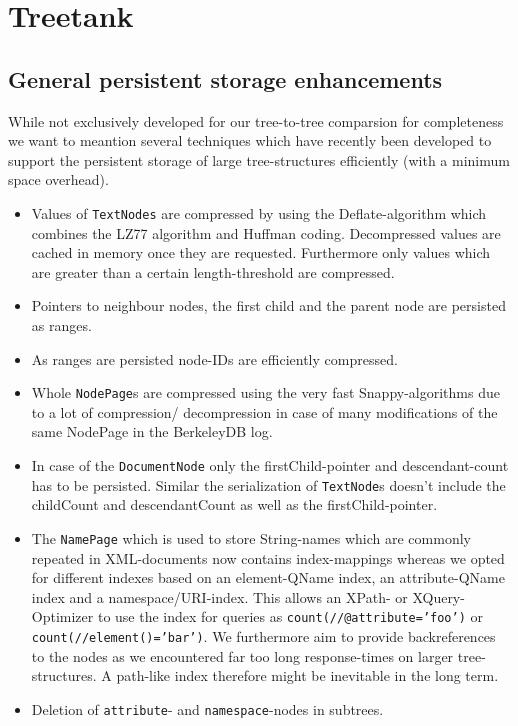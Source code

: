 \section{Treetank}\label{sec::treetank}

\subsection{General persistent storage enhancements}\label{subsec::storage}
While not exclusively developed for our tree-to-tree comparsion for completeness we want to meantion several techniques which have recently been developed to support the persistent storage of large tree-structures efficiently (with a minimum space overhead).

\begin{itemize}
\item Values of \texttt{TextNodes} are compressed by using the Deflate-algorithm which combines the LZ77 algorithm and Huffman coding. Decompressed values are cached in memory once they are requested. Furthermore only values which are greater than a certain length-threshold are compressed.
\item Pointers to neighbour nodes, the first child and the parent node are persisted as ranges.
\item As ranges are persisted node-IDs are efficiently compressed.
\item Whole \texttt{NodePage}s are compressed using the very fast Snappy-algorithms due to a lot of compression/ decompression in case of many modifications of the same NodePage in the BerkeleyDB log.
\item In case of the \texttt{DocumentNode} only the firstChild-pointer and descendant-count has to be persisted. Similar the serialization of \texttt{TextNode}s doesn't include the childCount and descendantCount as well as the firstChild-pointer.
\item The \texttt{NamePage} which is used to store String-names which are commonly repeated in XML-documents now contains index-mappings whereas we opted for different indexes based on an element-QName index, an attribute-QName index and a namespace/URI-index. This allows an XPath- or XQuery- Optimizer to use the index for queries as \texttt{count(//@attribute='foo')} or\\ \texttt{count(//element()='bar')}. We furthermore aim to provide backreferences to the nodes as we encountered far too long response-times on larger tree-structures. A path-like index therefore might be inevitable in the long term.
\item Deletion of \texttt{attribute}- and \texttt{namespace}-nodes in subtrees.
\end{itemize}

